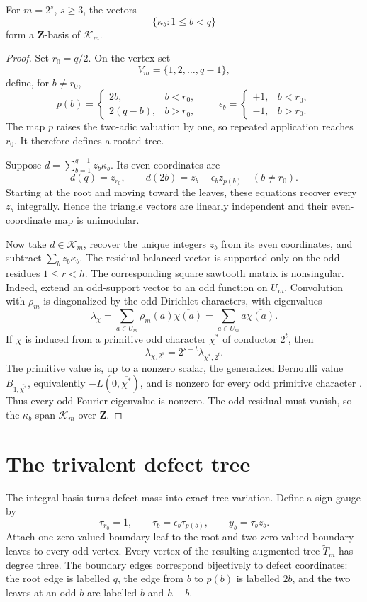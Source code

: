 \begin{manuscriptclaim}
For \(m=2^s\), \(s\ge3\), the vectors
\[
\{\kappa_b:1\le b<q\}
\]
form a \(\mathbf Z\)-basis of \(\mathcal K_m\).
\end{manuscriptclaim}
\begin{proof}
Set \(r_0=q/2\). On the vertex set
\[
V_m=\{1,2,\ldots,q-1\},
\]
define, for \(b\ne r_0\),
\[
p(b)=
\begin{cases}
2b,&b<r_0,\\
2(q-b),&b>r_0,
\end{cases}
\qquad
\epsilon_b=
\begin{cases}
+1,&b<r_0,\\
-1,&b>r_0.
\end{cases}
\]
The map \(p\) raises the two-adic valuation by one, so repeated application reaches \(r_0\). It therefore defines a rooted tree.

Suppose \(d=\sum_{b=1}^{q-1}z_b\kappa_b\). Its even coordinates are
\[
d(q)=z_{r_0},
\qquad
d(2b)=z_b-\epsilon_bz_{p(b)}
\quad(b\ne r_0).
\]
Starting at the root and moving toward the leaves, these equations recover every \(z_b\) integrally. Hence the triangle vectors are linearly independent and their even-coordinate map is unimodular.

Now take \(d\in\mathcal K_m\), recover the unique integers \(z_b\) from its even coordinates, and subtract \(\sum_bz_b\kappa_b\). The residual balanced vector is supported only on the odd residues \(1\le r<h\). The corresponding square sawtooth matrix is nonsingular. Indeed, extend an odd-support vector to an odd function on \(U_m\). Convolution with \(\rho_m\) is diagonalized by the odd Dirichlet characters, with eigenvalues
\[
\lambda_\chi=
\sum_{a\in U_m}\rho_m(a)\overline{\chi(a)}
=
\sum_{a\in U_m}a\overline{\chi(a)}.
\]
If \(\chi\) is induced from a primitive odd character \(\chi^*\) of conductor \(2^t\), then
\[
\lambda_{\chi,2^s}=2^{s-t}\lambda_{\chi^*,2^t}.
\]
The primitive value is, up to a nonzero scalar, the generalized Bernoulli value \(B_{1,\overline{\chi^*}}\), equivalently \(-L(0,\overline{\chi^*})\), and is nonzero for every odd primitive character \cite{WashingtonCyclotomic,SharifiDirichlet}. Thus every odd Fourier eigenvalue is nonzero. The odd residual must vanish, so the \(\kappa_b\) span \(\mathcal K_m\) over \(\mathbf Z\).
\end{proof}

\section{The trivalent defect tree}
The integral basis turns defect mass into exact tree variation. Define a sign gauge by
\[
\tau_{r_0}=1,
\qquad
\tau_b=\epsilon_b\tau_{p(b)},
\qquad
y_b=\tau_bz_b.
\]
Attach one zero-valued boundary leaf to the root and two zero-valued boundary leaves to every odd vertex. Every vertex of the resulting augmented tree \(\widetilde T_m\) has degree three. The boundary edges correspond bijectively to defect coordinates: the root edge is labelled \(q\), the edge from \(b\) to \(p(b)\) is labelled \(2b\), and the two leaves at an odd \(b\) are labelled \(b\) and \(h-b\).

